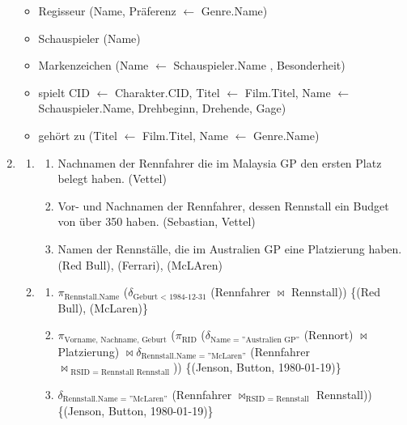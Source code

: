 \documentclass{article}
\begin{document}
\begin{enumerate}
\begin{itemize}
                    \item Regisseur (Name, Präferenz $\leftarrow$ Genre.Name)
                    \item Schauspieler (Name)
                    \item Markenzeichen (Name $\leftarrow$ Schauspieler.Name , Besonderheit)
                    \item spielt CID $\leftarrow$ Charakter.CID, Titel $\leftarrow$ Film.Titel, Name $\leftarrow$ Schauspieler.Name, Drehbeginn, Drehende, Gage)
                    \item gehört zu (Titel $\leftarrow$ Film.Titel, Name $\leftarrow$ Genre.Name)
                \end{itemize}
            \item
                \begin{enumerate}
                    \item 
                        \begin{enumerate}
                            \item Nachnamen der Rennfahrer die im Malaysia GP den ersten Platz belegt haben. {(Vettel)}
                            \item Vor- und Nachnamen der Rennfahrer, dessen Rennstall ein Budget von über 350 haben. {(Sebastian, Vettel)}
                            \item Namen der Rennställe, die im Australien GP eine Platzierung haben. {(Red Bull), (Ferrari), (McLAren)}
                        \end{enumerate}

                    \item
                        \begin{enumerate}
                            \item $\pi_{\text{Rennstall.Name}}$ ($\delta_{\text{Geburt $<$ 1984-12-31}}$ (Rennfahrer $\bowtie$ Rennstall)) \{(Red Bull), (McLaren)\}

                            \item $\pi_{\text{Vorname, Nachname, Geburt}}$ ($\pi_{\text{RID}}$ ($\delta_{\text{Name = ''Australien GP''}}$ (Rennort) $\bowtie$ Platzierung) $\bowtie \delta_{\text{Rennstall.Name = ''McLaren''}}$ (Rennfahrer $\bowtie_{\text{ RSID = Rennstall Rennstall}}$)) \{(Jenson, Button, 1980-01-19)\}


                            \item $\delta_{\text{Rennstall.Name = ''McLaren''}}$  (Rennfahrer $\bowtie_{\text{RSID = Rennstall}}$ Rennstall)) \{(Jenson, Button, 1980-01-19)\}


\end{enumerate}
\end{enumerate}
\end{enumerate}
\end{document}
